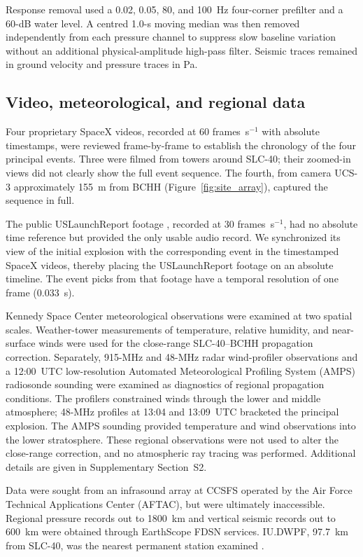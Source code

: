 \documentclass[]{seismica}
\begin{document}
Response removal used a 0.02, 0.05, 80, and 100~Hz four-corner prefilter and a
60-dB water level. A centred 1.0-s moving median was then removed independently
from each pressure channel to suppress slow baseline variation without an
additional physical-amplitude high-pass filter. Seismic traces remained in
ground velocity and pressure traces in Pa.

\subsection{Video, meteorological, and regional data}

Four proprietary SpaceX videos, recorded at 60 frames~s$^{-1}$ with
absolute timestamps, were reviewed frame-by-frame to establish the
chronology of the four principal events. Three were filmed from towers
around SLC-40; their zoomed-in views did not clearly show the full event
sequence. The fourth, from camera UCS-3 approximately 155~m from BCHH
(Figure~\ref{fig:site_array}), captured the sequence in full.

The public USLaunchReport footage \citep{uslaunchreport_amos6_video_2016},
recorded at 30 frames~s$^{-1}$, had no absolute time reference but
provided the only usable audio record. We synchronized its view of the
initial explosion with the corresponding event in the timestamped SpaceX
videos, thereby placing the USLaunchReport footage on an absolute
timeline. The event picks from that footage have a temporal resolution
of one frame (0.033~s).

Kennedy Space Center meteorological observations were examined at two
spatial scales. Weather-tower measurements of temperature, relative
humidity, and near-surface winds were used for the close-range SLC-40--BCHH
propagation correction. Separately, 915-MHz and 48-MHz radar wind-profiler
observations and a 12:00~UTC low-resolution
Automated Meteorological Profiling System (AMPS) radiosonde
sounding were examined as diagnostics of regional propagation conditions.
The profilers constrained winds through the lower and middle atmosphere;
48-MHz profiles at 13:04 and 13:09~UTC bracketed the principal explosion.
The AMPS sounding provided temperature and wind observations into the lower
stratosphere. These regional observations were not used to alter the
close-range correction, and no atmospheric ray tracing was performed.
Additional details are given in Supplementary Section~S2.

Data were sought from an infrasound array at CCSFS operated by the Air
Force Technical Applications Center (AFTAC), but were ultimately
inaccessible. Regional pressure records out to 1800~km and vertical
seismic records out to 600~km were obtained through EarthScope FDSN
services. IU.DWPF, 97.7~km from SLC-40, was the nearest permanent station
examined \citep{asl_gsn_iu_1988}.
\end{document}
